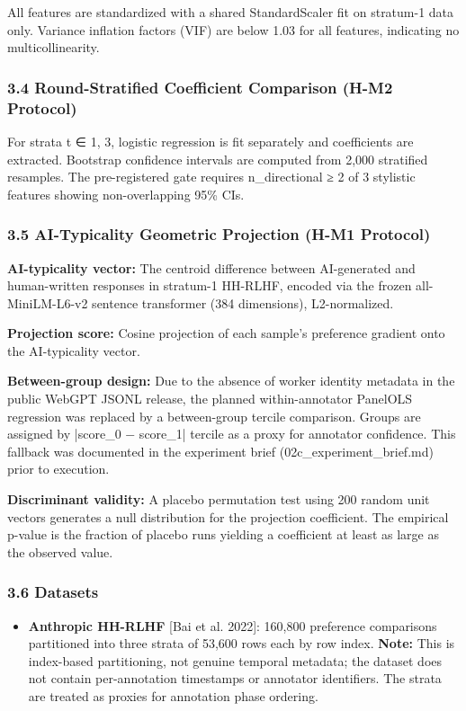 All features are standardized with a shared StandardScaler fit on stratum-1 data only. Variance inflation factors (VIF) are below 1.03 for all features, indicating no multicollinearity.

\subsubsection{3.4 Round-Stratified Coefficient Comparison (H-M2 Protocol)}

For strata t ∈ {1, 3}, logistic regression is fit separately and coefficients are extracted. Bootstrap confidence intervals are computed from 2,000 stratified resamples. The pre-registered gate requires n_directional ≥ 2 of 3 stylistic features showing non-overlapping 95\% CIs.

\subsubsection{3.5 AI-Typicality Geometric Projection (H-M1 Protocol)}

\textbf{AI-typicality vector:} The centroid difference between AI-generated and human-written responses in stratum-1 HH-RLHF, encoded via the frozen all-MiniLM-L6-v2 sentence transformer (384 dimensions), L2-normalized.

\textbf{Projection score:} Cosine projection of each sample's preference gradient onto the AI-typicality vector.

\textbf{Between-group design:} Due to the absence of worker identity metadata in the public WebGPT JSONL release, the planned within-annotator PanelOLS regression was replaced by a between-group tercile comparison. Groups are assigned by |score_0 − score_1| tercile as a proxy for annotator confidence. This fallback was documented in the experiment brief (02c_experiment_brief.md) prior to execution.

\textbf{Discriminant validity:} A placebo permutation test using 200 random unit vectors generates a null distribution for the projection coefficient. The empirical p-value is the fraction of placebo runs yielding a coefficient at least as large as the observed value.

\subsubsection{3.6 Datasets}

\begin{itemize}
\item \textbf{Anthropic HH-RLHF} [Bai et al. 2022]: 160,800 preference comparisons partitioned into three strata of 53,600 rows each by row index. \textbf{Note:} This is index-based partitioning, not genuine temporal metadata; the dataset does not contain per-annotation timestamps or annotator identifiers. The strata are treated as proxies for annotation phase ordering.
\end{itemize}

